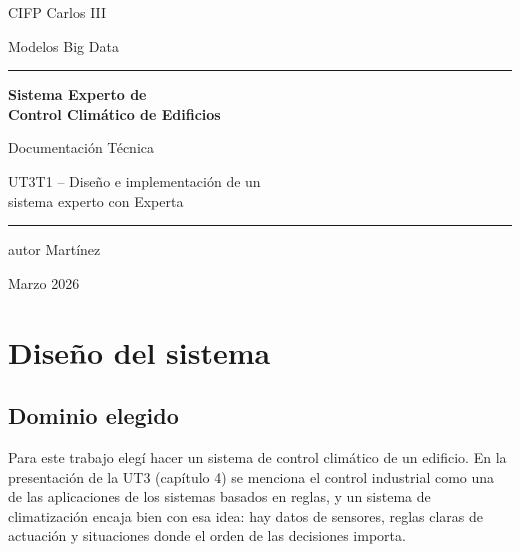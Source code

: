 \documentclass[12pt,a4paper]{article}
\begin{document}
\begin{titlepage}
\centering

\vspace*{2cm}

{\large CIFP Carlos III}

\vspace{0.3cm}

{\normalsize Modelos Big Data}

\vspace{0.5cm}

\rule{\textwidth}{1pt}

\vspace{1.5cm}

{\Huge\bfseries Sistema Experto de\\[0.4cm] Control Clim\'atico de Edificios}

\vspace{1.5cm}

{\Large Documentaci\'on T\'ecnica}

\vspace{0.5cm}

{\large UT3T1 -- Dise\~no e implementaci\'on de un\\sistema experto con Experta}

\vspace{1cm}

\rule{\textwidth}{1pt}

\vspace{2cm}

{\large autor Mart\'inez}

\vfill

{\large Marzo 2026}

\end{titlepage}

\tableofcontents
\newpage

\section{Dise\~no del sistema}

\subsection{Dominio elegido}

Para este trabajo eleg\'i hacer un sistema de control clim\'atico de un edificio. En la presentaci\'on de la UT3 (cap\'itulo 4) se menciona el control industrial como una de las aplicaciones de los sistemas basados en reglas, y un sistema de climatizaci\'on encaja bien con esa idea: hay datos de sensores, reglas claras de actuaci\'on y situaciones donde el orden de las decisiones importa.
\end{document}
